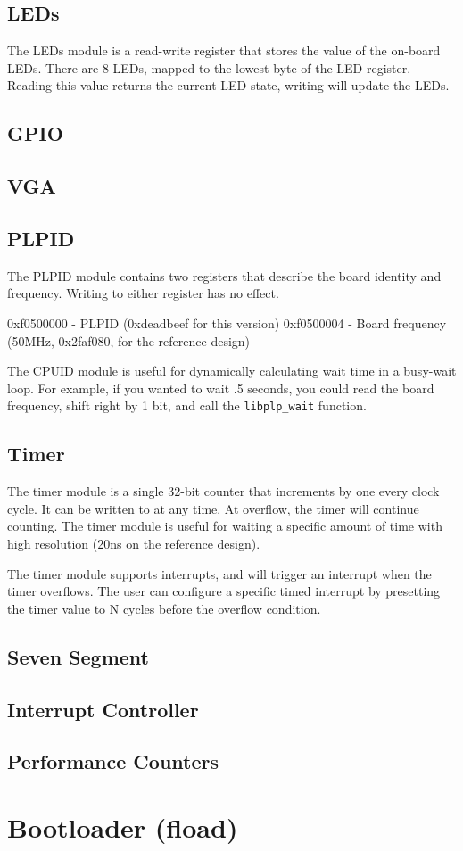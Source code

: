 \documentclass{article}
\begin{document}
\subsection{LEDs}
The LEDs module is a read-write register that stores the value of the on-board LEDs. There are 8 LEDs, mapped to the lowest byte of the LED register. Reading this value returns the current LED state, writing will update the LEDs. 
\subsection{GPIO}
\subsection{VGA}
\subsection{PLPID}
The PLPID module contains two registers that describe the board identity and frequency. Writing to either register has no effect.

0xf0500000 - PLPID (0xdeadbeef for this version) 0xf0500004 - Board frequency (50MHz, 0x2faf080, for the reference design)

The CPUID module is useful for dynamically calculating wait time in a busy-wait loop. For example, if you wanted to wait .5 seconds, you could read the board frequency, shift right by 1 bit, and call the \verb+libplp_wait+ function. 
\subsection{Timer}
The timer module is a single 32-bit counter that increments by one every clock cycle. It can be written to at any time. At overflow, the timer will continue counting. The timer module is useful for waiting a specific amount of time with high resolution (20ns on the reference design).

The timer module supports interrupts, and will trigger an interrupt when the timer overflows. The user can configure a specific timed interrupt by presetting the timer value to N cycles before the overflow condition. 
\subsection{Seven Segment}
\subsection{Interrupt Controller}
\subsection{Performance Counters}
\section{Bootloader (fload)}
\end{document}
